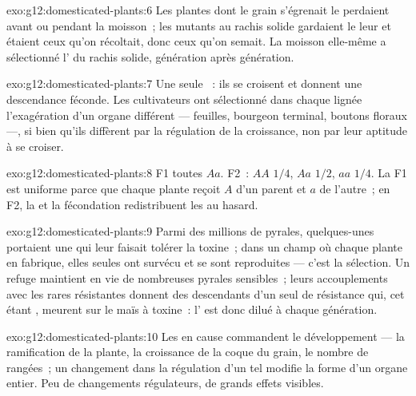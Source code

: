 \begin{solution}{exo:g12:domesticated-plants:6}
Les plantes dont le grain s'égrenait le perdaient avant ou pendant la
moisson~; les mutants au rachis solide gardaient le leur et étaient
ceux qu'on récoltait, donc ceux qu'on semait. La moisson elle-même a
sélectionné l' du rachis solide, génération après génération.
\end{solution}

\begin{solution}{exo:g12:domesticated-plants:7}
Une seule ~: ils se croisent et donnent une descendance féconde.
Les cultivateurs ont sélectionné dans chaque lignée l'exagération d'un
organe différent --- feuilles, bourgeon terminal, boutons
floraux ---, si bien qu'ils diffèrent par la régulation de la
croissance, non par leur aptitude à se croiser.
\end{solution}

\begin{solution}{exo:g12:domesticated-plants:8}
F1 toutes $Aa$. F2~: $AA$ $1/4$, $Aa$ $1/2$, $aa$ $1/4$. La F1 est
uniforme parce que chaque plante reçoit $A$ d'un parent et $a$ de
l'autre~; en F2, la  et la fécondation redistribuent les 
au hasard.
\end{solution}

\begin{solution}{exo:g12:domesticated-plants:9}
Parmi des millions de pyrales, quelques-unes portaient une 
qui leur faisait tolérer la toxine~; dans un champ où chaque plante en
fabrique, elles seules ont survécu et se sont reproduites --- c'est la
sélection. Un refuge maintient en vie de nombreuses pyrales
sensibles~; leurs accouplements avec les rares résistantes donnent des
descendants  d'un seul  de résistance qui, cet 
étant , meurent sur le maïs à toxine~: l' est donc dilué
à chaque génération.
\end{solution}

\begin{solution}{exo:g12:domesticated-plants:10}
Les  en cause commandent le développement --- la ramification de
la plante, la croissance de la coque du grain, le nombre de rangées~;
un changement dans la régulation d'un tel  modifie la forme d'un
organe entier. Peu de changements régulateurs, de grands effets
visibles.
\end{solution}

